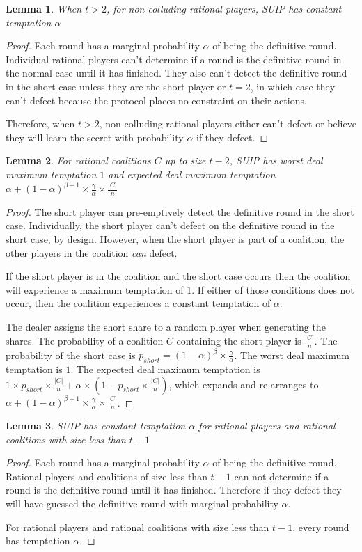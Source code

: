 \documentclass{dalcsthesis}
\newtheorem{lemma}{Lemma}
\begin{document}
\begin{lemma} When $t > 2$, for non-colluding rational players, SUIP has constant temptation $\alpha$ \end{lemma}
\begin{proof}
Each round has a marginal probability $\alpha$ of being the definitive round. Individual rational players can't determine if a round is the definitive round in the normal case until it has finished. They also can't detect the definitive round in the short case unless they are the short player or $t=2$, in which case they can't defect because the protocol places no constraint on their actions.

Therefore, when $t > 2$, non-colluding rational players either can't defect or believe they will learn the secret with probability $\alpha$ if they defect.
\end{proof}

\begin{lemma} For rational coalitions $C$ up to size $t-2$, SUIP has worst deal maximum temptation $1$ and expected deal maximum temptation $\alpha + (1-\alpha)^{\beta+1} \times \frac{\gamma}{\alpha} \times \frac{|C|}{n}$ \end{lemma}
\begin{proof}
The short player can pre-emptively detect the definitive round in the short case. Individually, the short player can't defect on the definitive round in the short case, by design. However, when the short player is part of a coalition, the other players in the coalition \emph{can} defect.

If the short player is in the coalition and the short case occurs then the coalition will experience a maximum temptation of $1$. If either of those conditions does not occur, then the coalition experiences a constant temptation of $\alpha$.

The dealer assigns the short share to a random player when generating the shares. The probability of a coalition $C$ containing the short player is $\frac{|C|}{n}$. The probability of the short case is $p_{short} = (1-\alpha)^\beta \times \frac{\gamma}{\alpha}$. The worst deal maximum temptation is $1$. The expected deal maximum temptation is $1 \times p_{short} \times \frac{|C|}{n} + \alpha \times (1 - p_{short} \times \frac{|C|}{n})$, which expands and re-arranges to $\alpha + (1-\alpha)^{\beta+1} \times \frac{\gamma}{\alpha} \times \frac{|C|}{n}$.
\end{proof}

\begin{lemma} SUIP has constant temptation $\alpha$ for rational players and rational coalitions with size less than $t-1$ \end{lemma}
\begin{proof}
Each round has a marginal probability $\alpha$ of being the definitive round. Rational players and coalitions of size less than $t-1$ can not determine if a round is the definitive round until it has finished. Therefore if they defect they will have guessed the definitive round with marginal probability $\alpha$.

For rational players and rational coalitions with size less than $t-1$, every round has temptation $\alpha$.
\end{proof}
\end{document}
